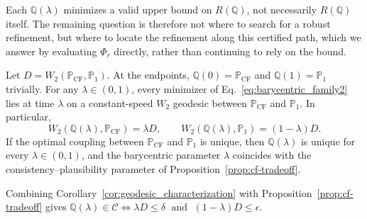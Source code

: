 Each $\mathbb{Q}(\lambda)$ minimizes a valid upper bound on $R(\mathbb{Q})$, not necessarily $R(\mathbb{Q})$ itself. %
The remaining question is therefore not where to search for a robust refinement, but where to locate the refinement along this certified path, which we answer by evaluating $\Phi_r$ directly, rather than continuing to rely on the bound.

\begin{corollary}
\label{cor:geodesic_characterization}
Let $D=W_2(\mathbb{P}_{\mathrm{CF}},\mathbb{P}_1)$.
At the endpoints, $\mathbb{Q}(0)= \mathbb{P}_\mathrm{CF}$ and $\mathbb{Q}(1)= \mathbb{P}_\mathrm{1}$ trivially.
For any $\lambda\in(0,1)$, every minimizer of Eq.~\ref{eq:barycentric_family2} lies at time $\lambda$ on a constant-speed $W_2$ geodesic between $\mathbb{P}_{\mathrm{CF}}$ and $\mathbb{P}_1$. In particular,
\begin{equation}
W_2(\mathbb{Q}(\lambda),\mathbb{P}_{\mathrm{CF}})
=
\lambda D,
\qquad
W_2(\mathbb{Q}(\lambda),\mathbb{P}_1)
=
(1-\lambda)D.
\label{eq:geodesic_distances}
\end{equation}
If the optimal coupling between $\mathbb{P}_{\mathrm{CF}}$ and $\mathbb{P}_1$ is unique, then $\mathbb{Q}(\lambda)$ is unique for every $\lambda\in(0,1)$, and the barycentric parameter $\lambda$ coincides with the \textcolor{frappe_red}{consistency}--plausibility parameter of Proposition~\ref{prop:cf-tradeoff}.
\end{corollary}

Combining Corollary~\ref{cor:geodesic_characterization} with Proposition~\ref{prop:cf-tradeoff} gives
$
\mathbb{Q}(\lambda)\in\mathcal{C}
\Longleftrightarrow
\lambda D\leq\delta
\;\text{ and }\;
(1-\lambda)D\leq\epsilon.
$

